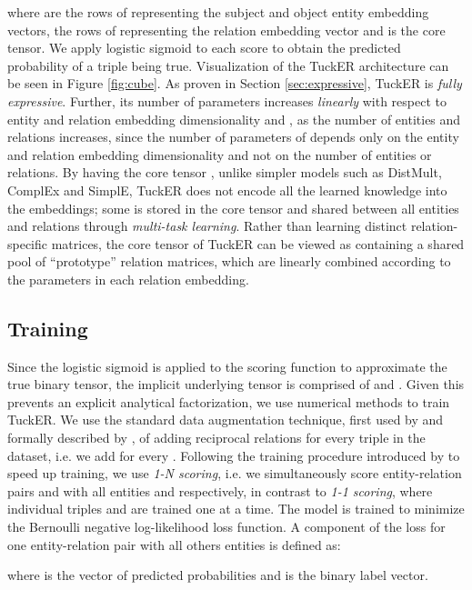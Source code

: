 \documentclass[11pt,a4paper]{article}
\begin{document}
where  are the rows of  representing the subject and object entity embedding vectors,  the rows of  representing the relation embedding vector and  is the core tensor. We apply logistic sigmoid to each score  to obtain the predicted probability  of a triple being true. Visualization of the TuckER architecture can be seen in Figure \ref{fig:cube}. As proven in Section \ref{sec:expressive}, TuckER is \textit{fully expressive}. Further, its number of parameters increases \emph{linearly} with respect to entity and relation embedding dimensionality  and , as the number of entities and relations increases, since the number of parameters of  depends only on the entity and relation embedding dimensionality and not on the number of entities or relations. By having the core tensor , unlike simpler models such as DistMult, ComplEx and SimplE, TuckER does not encode all the learned knowledge into the embeddings; some is stored in the core tensor and shared between all entities and relations through \textit{multi-task learning}. Rather than learning distinct relation-specific matrices, the core tensor of TuckER can be viewed as containing a shared pool of ``prototype'' relation matrices, which are linearly combined according to the parameters in each relation embedding. 

\subsection{Training}

Since the logistic sigmoid is applied to the scoring function to approximate the true binary tensor, the implicit underlying tensor is comprised of  and . Given this prevents an explicit analytical factorization, we use numerical methods to train TuckER. We use the standard data augmentation technique, first used by \citet{dettmers2018convolutional} and formally described by \citet{lacroix2018canonical}, of adding reciprocal relations for every triple in the dataset, i.e. we add  for every . Following the training procedure introduced by \citet{dettmers2018convolutional} to speed up training, we use \textit{1-N scoring}, i.e. we simultaneously score entity-relation pairs  and  with all entities  and  respectively, in contrast to \textit{1-1 scoring}, where individual triples  and  are trained one at a time. The model is trained to minimize the Bernoulli negative log-likelihood loss function. A component of the loss for one entity-relation pair with all others entities is defined as:

where  is the vector of predicted probabilities and  is the binary label vector.
\end{document}
